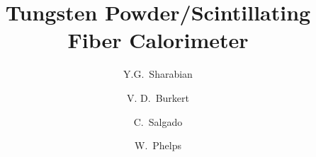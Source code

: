 \title{Tungsten Powder/Scintillating Fiber Calorimeter}
\author[A]{Y.G.~Sharabian}
\author[A]{V. D.~Burkert}
\author[B]{C.~Salgado}
\author[C]{W.~Phelps}

\address[A]{Thomas Jefferson National Accelerator Facility, Newport News, VA, 23606, USA}
\address[B]{Norfolk State University, Norfolk, VA 23504, USA}
\address[C]{Christopher Newport University, Newport News, VA 23606, USA}
\begin{comment}
	\address[C]{Christopher Newport University, Newport News, VA 23606, USA}
	\address[D]{Arizona State University, Tempe, AZ}
\end{comment}


